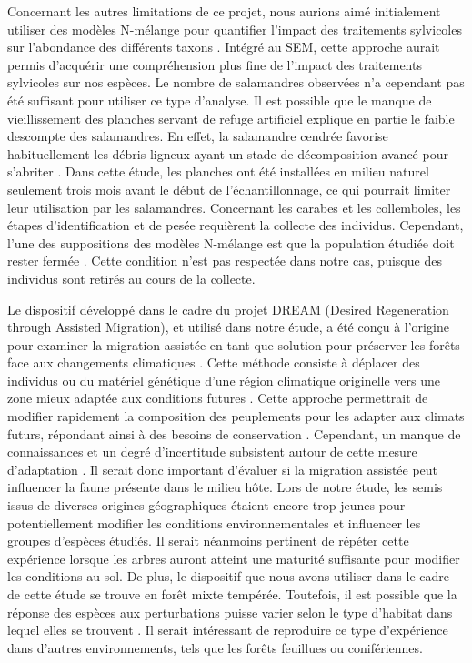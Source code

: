 Concernant les autres limitations de ce projet, nous aurions aimé initialement utiliser des modèles N-mélange pour quantifier l'impact des traitements sylvicoles sur l'abondance des différents taxons \citep{Royle2004Nmixturemodels,Mazerolle2021Woodlandsalamander}. 
Intégré au SEM, cette approche aurait permis d'acquérir une compréhension plus fine de l'impact des traitements sylvicoles sur nos espèces. 
Le nombre de salamandres observées n'a cependant pas été suffisant pour utiliser ce type d'analyse. 
Il est possible que le manque de vieillissement des planches servant de refuge artificiel explique en partie le faible descompte des salamandres. 
En effet, la salamandre cendrée favorise habituellement les débris ligneux ayant un stade de décomposition avancé pour s'abriter \citep{Otto2011ComparingCover,hedrickEffectsCoverboardAge2021}. 
Dans cette étude, les planches ont été installées en milieu naturel seulement trois mois avant le début de l'échantillonnage, ce qui pourrait limiter leur utilisation par les salamandres. 
Concernant les carabes et les collemboles, les étapes d’identification et de pesée requièrent la collecte des individus. 
Cependant, l’une des suppositions des modèles N-mélange est que la population étudiée doit rester fermée \citep{Royle2004Nmixturemodels}. 
Cette condition n’est pas respectée dans notre cas, puisque des individus sont retirés au cours de la collecte.

Le dispositif développé dans le cadre du projet DREAM (Desired Regeneration through Assisted Migration), et utilisé dans notre étude, a été conçu à l'origine pour examiner la migration assistée en tant que solution pour préserver les forêts face aux changements climatiques \citep{royoDesiredREgenerationAssisted2023}. 
Cette méthode consiste à déplacer des individus ou du matériel génétique d’une région climatique originelle vers une zone mieux adaptée aux conditions futures \citep{Vitt2010Assistedmigration}. 
Cette approche permettrait de modifier rapidement la composition des peuplements pour les adapter aux climats futurs, répondant ainsi à des besoins de conservation \citep{Dumroese2015Considerationsrestoring,Park2018Informationunderload,Park2023Provenancetrials}. 
Cependant, un manque de connaissances et un degré d’incertitude subsistent autour de cette mesure d’adaptation \citep{Klenk2015assistedmigration,Park2018Informationunderload}. 
Il serait donc important d’évaluer si la migration assistée peut influencer la faune présente dans le milieu hôte.
Lors de notre étude, les semis issus de diverses origines géographiques étaient encore trop jeunes pour potentiellement modifier les conditions environnementales et influencer les groupes d’espèces étudiés. 
Il serait néanmoins pertinent de répéter cette expérience lorsque les arbres auront atteint une maturité suffisante pour modifier les conditions au sol. 
De plus, le dispositif que nous avons utiliser dans le cadre de cette étude se trouve en forêt mixte tempérée.
Toutefois, il est possible que la réponse des espèces aux perturbations puisse varier selon le type d'habitat dans lequel elles se trouvent \citep{Kudrin2023metaanalysiseffects}. 
Il serait intéressant de reproduire ce type d'expérience dans d'autres environnements, tels que les forêts feuillues ou conifériennes.

